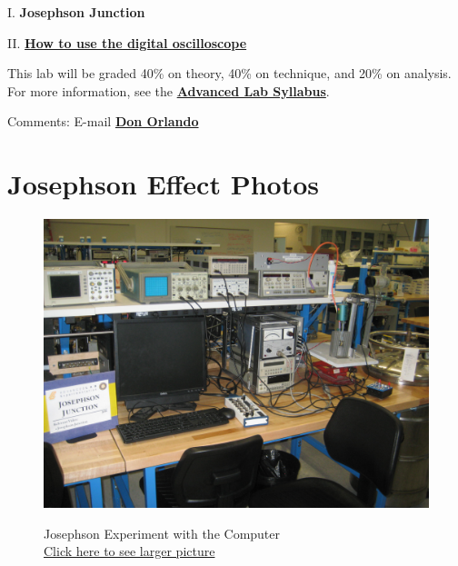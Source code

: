 \documentclass{../lab}
\begin{document}
I. \textbf{Josephson Junction}

II. \href{http://experimentationlab.berkeley.edu/node/104}{\textbf{How to use the digital oscilloscope}}

This lab will be graded 40\% on theory, 40\% on technique, and 20\% on analysis. For more information, see the \href{\AdvancedLabSyllabus}{\textbf{Advanced Lab Syllabus}}.

Comments: E-mail \href{\MailDonOrlando}{\textbf{Don Orlando}}

\section{Josephson Effect Photos}

\noindent
\begin{figure}[H]
\captionsetup{justification=centering}
  \href{http://experimentationlab.berkeley.edu/sites/default/files/images/JOS_3507.jpg}{\includegraphics[width=\linewidth,keepaspectratio]{images/JOS_3507.jpg}}
  \caption{Josephson Experiment with the Computer \\ \href{http://experimentationlab.berkeley.edu/sites/default/files/images/JOS_3507.jpg}{Click here to see larger picture}}
  \label{fig:JOS_3507.jpg}
\endminipage\hfill
{}

\end{figure}
\end{document}
